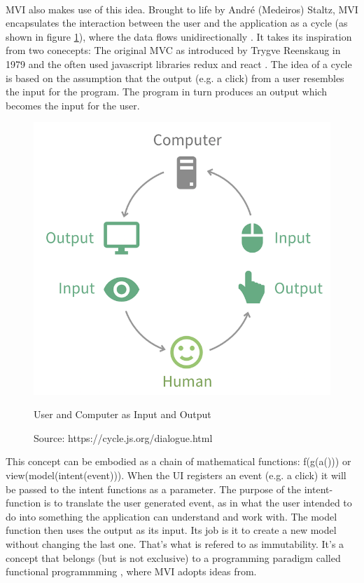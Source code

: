 \\
MVI also makes use of this idea. Brought to life by André (Medeiros) Staltz, MVI encapsulates the interaction between the user and the application as a cycle 
(as shown in figure 
\ref{fig:userComputerInputOutput}), 
where the data flows unidirectionally 
\cite{unidirectionalDataFlowRedux}.
It takes its inspiration from two conecepts: The original MVC as introduced by Trygve Reenskaug in 1979 
\cite{wikipediaTrygveReenskaug} 
and the often used javascript libraries redux 
\cite{redux} 
and react 
\cite{react}. 
The idea of a cycle is based on the assumption that the output (e.g. a click) from a user resembles the input for the program. The program in turn produces an output 
which becomes the input for the user.
\begin{figure}[ht]
    \centering
    \includegraphics[height=0.5\textwidth]{./images/mvi-cycle}
    \caption{User and Computer as Input and Output}
    \caption*{Source: https://cycle.js.org/dialogue.html}
    \label{fig:userComputerInputOutput}
\end{figure}
This concept can be embodied as a chain of mathematical functions: f(g(a())) or view(model(intent(event))).
When the UI registers an event (e.g. a click) it will be passed to the intent functions as a parameter. The purpose of the intent-function is 
to translate the user generated event, as in what the user intended to do into something the application can understand and work with.
The model function then uses the output as its input. Its job is it to create a new model without changing the last one. That's what is refered to as immutability. 
\cite{immutableObjectsEffectiveJava}
It's a concept that belongs (but is not exclusive) to a programming paradigm called functional programmming
\cite{functionalProgrammingWikiHaskell,functionalProgrammingPractical,programmingInHaskellFunctionalProgrammingDefinition},
where MVI adopts ideas from.
